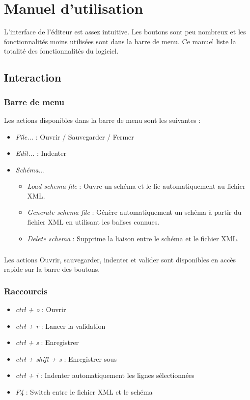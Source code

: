 \chapter{Manuel d'utilisation}

L'interface de l'éditeur est assez intuitive. Les boutons sont peu nombreux et les fonctionnalités moins utilisées sont dans la barre de menu.
Ce manuel liste la totalité des fonctionnalités du logiciel.

\section{Interaction}

\subsection{Barre de menu}


Les actions disponibles dans la barre de menu sont les suivantes :
\begin{itemize}
\item \emph{File...} : Ouvrir / Sauvegarder / Fermer
\item \emph{Edit...} : Indenter
\item \emph{Schéma...}
	\begin{itemize}
	\item \emph{Load schema file} : Ouvre un schéma et le lie automatiquement au fichier XML.
	\item \emph{Generate schema file} : Génère automatiquement un schéma à partir du fichier XML en utilisant les balises connues.
	\item \emph{Delete schema} : Supprime la liaison entre le schéma et le fichier XML.
	\end{itemize}
\end{itemize}

\paragraph{}
Les actions Ouvrir, sauvegarder, indenter et valider sont disponibles en accès rapide sur la barre des boutons.

\subsection{Raccourcis}
\begin{itemize}
\item \emph{ctrl + o} : Ouvrir
\item \emph{ctrl + r} : Lancer la validation
\item \emph{ctrl + s} : Enregistrer 
\item \emph{ctrl + shift + s} : Enregistrer sous
\item \emph{ctrl + i} : Indenter automatiquement les lignes sélectionnées
\item \emph{F4} : Switch entre le fichier XML et le schéma
\end{itemize}

